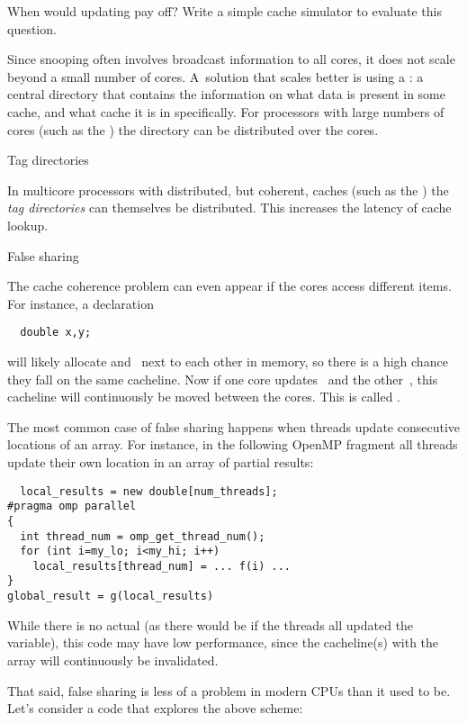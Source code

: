 \begin{exercise}
  When would updating pay off? Write a simple cache simulator to evaluate this question.
\end{exercise}

Since snooping often involves broadcast information to all cores, it
does not scale beyond a small number of cores. A~solution that scales
better is using a : a central directory
that contains the information on what data is present in some cache,
and what cache it is in specifically. For processors with large
numbers of cores (such as the ) the
directory can be distributed over the cores.

 {Tag directories}

In multicore processors with distributed, but coherent, caches
(such as the )
the
%
\emph{tag directories}
can themselves be distributed. This increases the latency of cache lookup.

 {False sharing}
\label{sec:falseshare}

The cache coherence problem can even appear if the cores access
different items. For instance, a declaration
\begin{verbatim}
  double x,y;
\end{verbatim}
will likely allocate  and~ next to each other in memory, so
there is a high chance they fall on the same cacheline. Now if one
core updates~ and the other~, this cacheline will
continuously be moved between the cores. This is called
.

The most common case of false sharing happens when
threads update consecutive locations of an array. For instance, in the
following OpenMP fragment all threads update their own location in an
array of partial results:
\begin{verbatim}
  local_results = new double[num_threads];
#pragma omp parallel
{
  int thread_num = omp_get_thread_num();
  for (int i=my_lo; i<my_hi; i++)
    local_results[thread_num] = ... f(i) ...
}
global_result = g(local_results)
\end{verbatim}
While there is no actual  (as there would be
if the threads all updated the  variable),
this code may have low performance, since the cacheline(s) with the
 array will continuously be invalidated.

That said, false sharing is less of a problem in modern CPUs
than it used to be. Let's consider a code that explores the above scheme:
%

